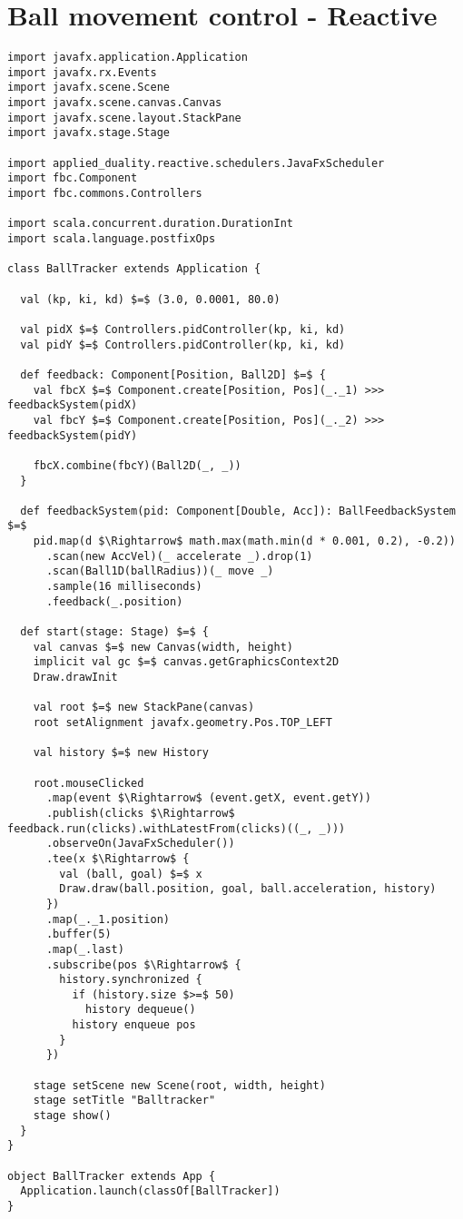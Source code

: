 \chapter{Ball movement control - Reactive}
\label{app:ball-movement-reactive}

\begin{lstlisting}[style=ScalaStyle, caption={Ball movement control}, label={lst:ball-full-app-reactive}]
import javafx.application.Application
import javafx.rx.Events
import javafx.scene.Scene
import javafx.scene.canvas.Canvas
import javafx.scene.layout.StackPane
import javafx.stage.Stage

import applied_duality.reactive.schedulers.JavaFxScheduler
import fbc.Component
import fbc.commons.Controllers

import scala.concurrent.duration.DurationInt
import scala.language.postfixOps

class BallTracker extends Application {

  val (kp, ki, kd) $=$ (3.0, 0.0001, 80.0)

  val pidX $=$ Controllers.pidController(kp, ki, kd)
  val pidY $=$ Controllers.pidController(kp, ki, kd)

  def feedback: Component[Position, Ball2D] $=$ {
    val fbcX $=$ Component.create[Position, Pos](_._1) >>> feedbackSystem(pidX)
    val fbcY $=$ Component.create[Position, Pos](_._2) >>> feedbackSystem(pidY)

    fbcX.combine(fbcY)(Ball2D(_, _))
  }

  def feedbackSystem(pid: Component[Double, Acc]): BallFeedbackSystem $=$
    pid.map(d $\Rightarrow$ math.max(math.min(d * 0.001, 0.2), -0.2))
      .scan(new AccVel)(_ accelerate _).drop(1)
      .scan(Ball1D(ballRadius))(_ move _)
      .sample(16 milliseconds)
      .feedback(_.position)

  def start(stage: Stage) $=$ {
    val canvas $=$ new Canvas(width, height)
    implicit val gc $=$ canvas.getGraphicsContext2D
    Draw.drawInit

    val root $=$ new StackPane(canvas)
    root setAlignment javafx.geometry.Pos.TOP_LEFT

    val history $=$ new History

    root.mouseClicked
      .map(event $\Rightarrow$ (event.getX, event.getY))
      .publish(clicks $\Rightarrow$ feedback.run(clicks).withLatestFrom(clicks)((_, _)))
      .observeOn(JavaFxScheduler())
      .tee(x $\Rightarrow$ {
        val (ball, goal) $=$ x
        Draw.draw(ball.position, goal, ball.acceleration, history)
      })
      .map(_._1.position)
      .buffer(5)
      .map(_.last)
      .subscribe(pos $\Rightarrow$ {
        history.synchronized {
          if (history.size $>=$ 50)
            history dequeue()
          history enqueue pos
        }
      })

    stage setScene new Scene(root, width, height)
    stage setTitle "Balltracker"
    stage show()
  }
}

object BallTracker extends App {
  Application.launch(classOf[BallTracker])
}
\end{lstlisting}


